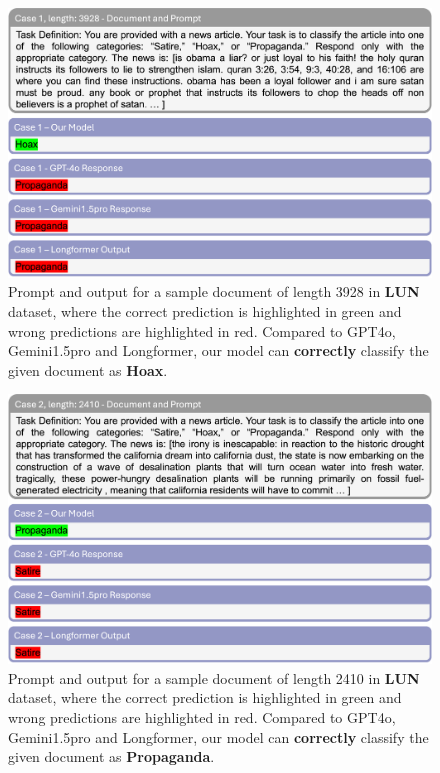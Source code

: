\documentclass[11pt]{article}
\begin{document}
\begin{figure}[!h]
    \vspace{-5pt}
    \centering
    \includegraphics[width=1.0\linewidth]{images/case1.png}
    \caption{Prompt and output for a sample document of length 3928 in \textbf{LUN} dataset, where the correct prediction is highlighted in green and wrong predictions are highlighted in red. Compared to GPT4o, Gemini1.5pro and Longformer, our model can \textbf{correctly} classify the given document as \textbf{Hoax}.}
    \label{fig:case1}
\end{figure}

\begin{figure}[!h]
    \centering
    \includegraphics[width=1.0\linewidth]{images/case2.png}
    \caption{Prompt and output for a sample document of length 2410 in \textbf{LUN} dataset, where the correct prediction is highlighted in green and wrong predictions are highlighted in red. Compared to GPT4o, Gemini1.5pro and Longformer, our model can \textbf{correctly} classify the given document as \textbf{Propaganda}.}
    \label{fig:case2}
\end{figure}
\end{document}

